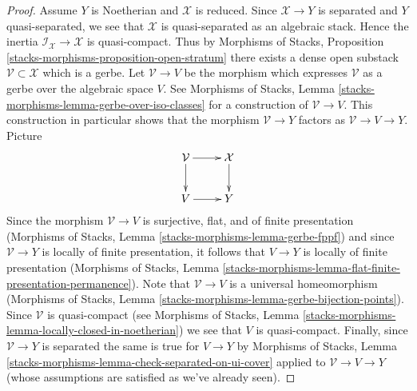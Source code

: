 \documentclass[10pt,a4paper]{amsart}
\theoremstyle{plain}
\theoremstyle{definition}
\theoremstyle{remark}
\numberwithin{equation}{subsection}
\begin{document}
\begin{proof}
\medskip\noindent
Assume $Y$ is Noetherian and $\mathcal{X}$ is reduced.
Since $\mathcal{X} \to Y$ is separated and $Y$ quasi-separated,
we see that $\mathcal{X}$ is quasi-separated as an algebraic stack.
Hence the inertia $\mathcal{I}_\mathcal{X} \to \mathcal{X}$
is quasi-compact. Thus by Morphisms of Stacks, Proposition
\ref{stacks-morphisms-proposition-open-stratum}
there exists a dense open substack $\mathcal{V} \subset \mathcal{X}$
which is a gerbe. Let $\mathcal{V} \to V$ be the morphism
which expresses $\mathcal{V}$ as a gerbe over the algebraic space $V$.
See
Morphisms of Stacks, Lemma \ref{stacks-morphisms-lemma-gerbe-over-iso-classes}
for a construction of $\mathcal{V} \to V$.
This construction in particular shows that the morphism
$\mathcal{V} \to Y$ factors as $\mathcal{V} \to V \to Y$.
Picture
$$
\xymatrix{
\mathcal{V} \ar[r] \ar[d] & \mathcal{X} \ar[d] \\
V \ar[r] & Y
}
$$
Since the morphism $\mathcal{V} \to V$ is surjective, flat, and
of finite presentation
(Morphisms of Stacks, Lemma \ref{stacks-morphisms-lemma-gerbe-fppf})
and since $\mathcal{V} \to Y$ is locally of finite presentation,
it follows that $V \to Y$ is locally of finite presentation
(Morphisms of Stacks, Lemma
\ref{stacks-morphisms-lemma-flat-finite-presentation-permanence}).
Note that $\mathcal{V} \to V$ is a universal homeomorphism
(Morphisms of Stacks, Lemma
\ref{stacks-morphisms-lemma-gerbe-bijection-points}).
Since $\mathcal{V}$ is quasi-compact (see
Morphisms of Stacks, Lemma
\ref{stacks-morphisms-lemma-locally-closed-in-noetherian})
we see that $V$ is quasi-compact.
Finally, since $\mathcal{V} \to Y$ is separated the same is true
for $V \to Y$ by
Morphisms of Stacks, Lemma
\ref{stacks-morphisms-lemma-check-separated-on-ui-cover}
applied to $\mathcal{V} \to V \to Y$
(whose assumptions are satisfied as we've already seen).


\end{proof}
\end{document}
